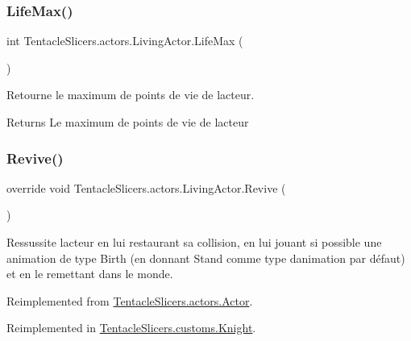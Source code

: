 \subsubsection{\texorpdfstring{Life\+Max()}{LifeMax()}}
{\footnotesize\ttfamily int Tentacle\+Slicers.\+actors.\+Living\+Actor.\+Life\+Max (\begin{DoxyParamCaption}{ }\end{DoxyParamCaption})}



Retourne le maximum de points de vie de l\textquotesingle{}acteur. 

\begin{DoxyReturn}{Returns}
Le maximum de points de vie de l\textquotesingle{}acteur 
\end{DoxyReturn}
\mbox{\label{class_tentacle_slicers_1_1actors_1_1_living_actor_a7a2b73efca826044f8d15bdc94e13cf7}} 
\subsubsection{\texorpdfstring{Revive()}{Revive()}}
{\footnotesize\ttfamily override void Tentacle\+Slicers.\+actors.\+Living\+Actor.\+Revive (\begin{DoxyParamCaption}{ }\end{DoxyParamCaption})\hspace{0.3cm}{\ttfamily [virtual]}}



Ressussite l\textquotesingle{}acteur en lui restaurant sa collision, en lui jouant si possible une animation de type Birth (en donnant Stand comme type d\textquotesingle{}animation par défaut) et en le remettant dans le monde. 



Reimplemented from \hyperlink{class_tentacle_slicers_1_1actors_1_1_actor_aa41129d0d5981d185b00a8376505ebf6}{Tentacle\+Slicers.\+actors.\+Actor}.



Reimplemented in \hyperlink{class_tentacle_slicers_1_1customs_1_1_knight_a32666ab0b1401a669d4c32237c310c3e}{Tentacle\+Slicers.\+customs.\+Knight}.

\mbox{\label{class_tentacle_slicers_1_1actors_1_1_living_actor_ac5f070aa8e36c2815070a654a242b9ef}} 
